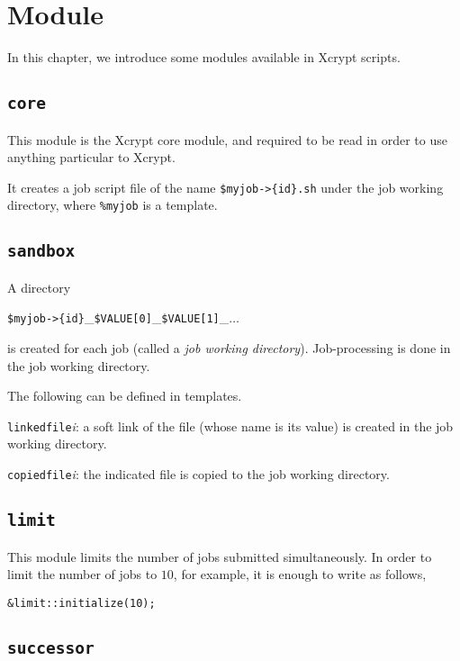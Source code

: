 \documentclass[a4paper,10pt]{report}
\begin{document}
\chapter{Module}\label{chapmodule}

In this chapter, we introduce some modules available in Xcrypt scripts.

\section{\texttt{core}}

This module is the Xcrypt core module, and required to be read in
order to use anything particular to Xcrypt.

It creates a job script file of the name \texttt{\$myjob->\{id\}.sh}
under the job working directory, where \texttt{\%myjob} is a template.

\section{\texttt{sandbox}}

A directory
\begin{center}
 \texttt{\$myjob->\{id\}}\_\texttt{\$VALUE[0]}\_\texttt{\$VALUE[1]}\_$\ldots$
\end{center}
is created for each job (called a \textit{job working directory}).
Job-processing is done in the job working directory.

The following can be defined in templates.

\texttt{linkedfile}\textit{i}: a soft link of the file (whose name is
its value) is created in the job working directory.

\texttt{copiedfile}\textit{i}: the indicated file is copied to the job
working directory.

\section{\texttt{limit}}

This module limits the number of jobs submitted simultaneously.
In order to limit the number of jobs to $10$, for example, it is enough to
write as follows,
\begin{boxnote}
\begin{verbatim}
&limit::initialize(10);
\end{verbatim}
\end{boxnote}

\section{\texttt{successor}}
\end{document}
